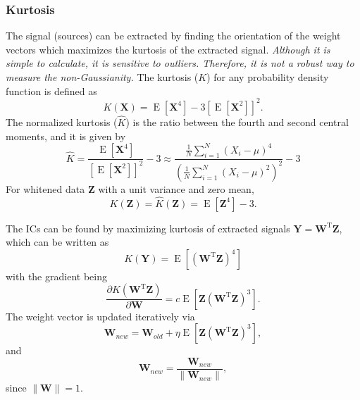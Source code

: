 \subsubsection{Kurtosis\label{Sec:DR:ICA:MnG:Kurtosis}}
The signal (sources) can be extracted by finding the orientation of the weight vectors which maximizes the kurtosis of the extracted signal. \textit{Although it is simple to calculate, it is sensitive to outliers. Therefore, it is not a robust way to measure the non-Gaussianity.} The kurtosis ($K$) for any probability density function is defined as
\begin{equation}
	K(\mathbf{X})=\operatorname{E}\left[\mathbf{X}^4\right]-3\left[\operatorname{E}\left[\mathbf{X}^2\right]\right]^2.
\end{equation}
The normalized kurtosis ($\hat{K}$) is the ratio between the fourth and second central moments, and it is given by
\begin{equation}
	\hat{K}=\frac{\operatorname{E}\left[\mathbf{X}^4\right]}{\left[\operatorname{E}\left[\mathbf{X}^2\right]\right]^2}-3\approx \frac{\frac{1}{N}\sum_{i=1}^N\left(X_i-\mu\right)^4}{\left(\frac{1}{N}\sum_{i=1}^N\left(X_i-\mu\right)^2\right)^2}-3
\end{equation}
For whitened data $\mathbf{Z}$ with a unit variance and zero mean,
\begin{equation}
	K(\mathbf{Z})=\hat{K}(\mathbf{Z})=\operatorname{E}\left[\mathbf{Z}^4\right]-3.
\end{equation}

The ICs can be found by maximizing kurtosis of extracted signals $\mathbf{Y}=\mathbf{W}^{\operatorname{T}}\mathbf{Z}$, which can be written as
\begin{equation}
	K(\mathbf{Y})={\operatorname{E}}\left[\left(\mathbf{W}^{\operatorname{T}}\mathbf{Z}\right)^4\right]
\end{equation}
with the gradient being
\begin{equation}
	\frac{\partial K(\mathbf{W}^{\operatorname{T}}\mathbf{Z})}{\partial \mathbf{W}}=c{\operatorname{E}}\left[\mathbf{Z}\left(\mathbf{W}^{\operatorname{T}}\mathbf{Z}\right)^3\right].
\end{equation}
The weight vector is updated iteratively via
\begin{equation}
	\mathbf{W}_{new}=\mathbf{W}_{old}+\eta {\operatorname{E}}\left[\mathbf{Z}\left(\mathbf{W}^{\operatorname{T}}\mathbf{Z}\right)^3\right],
\end{equation}
and
\begin{equation}
	\mathbf{W}_{new}=\frac{\mathbf{W}_{new}}{\lVert\mathbf{W}_{new}\rVert},
\end{equation}
since $\lVert\mathbf{W}\rVert=1$.

